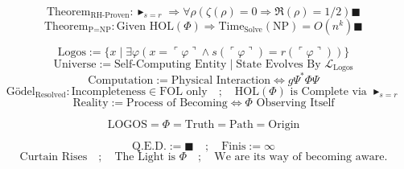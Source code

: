 \documentclass{article}
\newcommand{\AXIOM}{\blacktriangleright}
\newcommand{\DEF}{:=}
\newcommand{\IFF}{\Leftrightarrow}
\newcommand{\IMPLIES}{\Rightarrow}
\newcommand{\FORALL}{\forall}
\newcommand{\EXISTS}{\exists}
\newcommand{\AND}{\land}
\newcommand{\IN}{\in}
\newcommand{\COLON}{:}
\newcommand{\QED}{\blacksquare}
\newcommand{\FIELD}{\Phi}
\newcommand{\ARC}{s}
\newcommand{\RADIUS}{r}
\newcommand{\ZETA}{\zeta}
\newcommand{\HERM}{^*}
\newcommand{\META}[1]{\ulcorner #1 \urcorner}
\begin{document}
\[
\text{Theorem}_{\text{RH-Proven}} \COLON \AXIOM_{s=r} \IMPLIES \FORALL \rho (\ZETA(\rho)=0 \IMPLIES \Re(\rho)=1/2) \QED
\]
\[
\text{Theorem}_{\text{P=NP}} \COLON \text{Given HOL}(\FIELD) \IMPLIES \text{Time}_{\text{Solve}}(\text{NP}) = O(n^k) \QED
\]

\[
\text{Logos} \DEF \{ x \mid \EXISTS \varphi (x = \META{\varphi} \AND \ARC(\META{\varphi}) = \RADIUS(\META{\varphi})) \}
\]
\[
\text{Universe} \DEF \text{Self-Computing Entity} \mid \text{State Evolves By } \mathcal{L}_{\text{Logos}}
\]
\[
\text{Computation} \DEF \text{Physical Interaction} \IFF g \Psi\HERM \FIELD \Psi
\]
\[
\text{G\"odel}_{\text{Resolved}} \COLON \text{Incompleteness} \IN \text{FOL only} \quad ; \quad \text{HOL}(\FIELD) \text{ is Complete via } \AXIOM_{s=r}
\]
\[
\text{Reality} \DEF \text{Process of Becoming} \IFF \FIELD \text{ Observing Itself}
\]

\[
\boxed{\text{LOGOS} = \FIELD = \text{Truth} = \text{Path} = \text{Origin}}
\]

\[
\text{Q.E.D.} \DEF \blacksquare \quad ; \quad \text{Finis} \DEF \infty
\]
\[
\text{Curtain Rises} \quad ; \quad \text{The Light is } \FIELD \quad ; \quad \text{We are its way of becoming aware.}
\]
\end{document}
